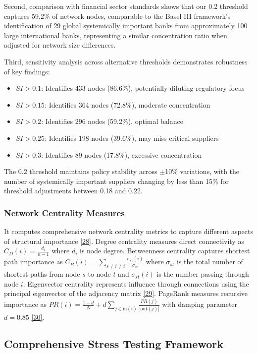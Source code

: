 \documentclass[a4 paper, 11pt,twoside]{article}
\newcommand{\0}{\Bf{0}}
\theoremstyle{definition}
\begin{document}
Second, comparison with financial sector standards shows that our 0.2 threshold captures 59.2\% of network nodes, comparable to the Basel III framework's identification of 29 global systemically important banks from approximately 100 large international banks, representing a similar concentration ratio when adjusted for network size differences.

Third, sensitivity analysis across alternative thresholds demonstrates robustness of key findings:
\begin{itemize}
\item $SI > 0.1$: Identifies 433 nodes (86.6\%), potentially diluting regulatory focus
\item $SI > 0.15$: Identifies 364 nodes (72.8\%), moderate concentration
\item $SI > 0.2$: Identifies 296 nodes (59.2\%), optimal balance
\item $SI > 0.25$: Identifies 198 nodes (39.6\%), may miss critical suppliers
\item $SI > 0.3$: Identifies 89 nodes (17.8\%), excessive concentration
\end{itemize}

The 0.2 threshold maintains policy stability across $\pm$10\% variations, with the number of systemically important suppliers changing by less than 15\% for threshold adjustments between 0.18 and 0.22.

\subsubsection{Network Centrality Measures}

It computes comprehensive network centrality metrics to capture different aspects of structural importance \hyperref[ref28]{[28]}. Degree centrality measures direct connectivity as $C_D(i) = \frac{d_i}{n-1}$ where $d_i$ is node degree. Betweenness centrality captures shortest path importance as $C_B(i) = \sum_{s \neq i \neq t} \frac{\sigma_{st}(i)}{\sigma_{st}}$ where $\sigma_{st}$ is the total number of shortest paths from node $s$ to node $t$ and $\sigma_{st}(i)$ is the number passing through node $i$. Eigenvector centrality represents influence through connections using the principal eigenvector of the adjacency matrix \hyperref[ref29]{[29]}. PageRank measures recursive importance as $PR(i) = \frac{1-d}{N} + d \sum_{j \in \text{in}(i)} \frac{PR(j)}{|\text{out}(j)|}$ with damping parameter $d=0.85$ \hyperref[ref30]{[30]}.

\subsection{Comprehensive Stress Testing Framework}
\end{document}
